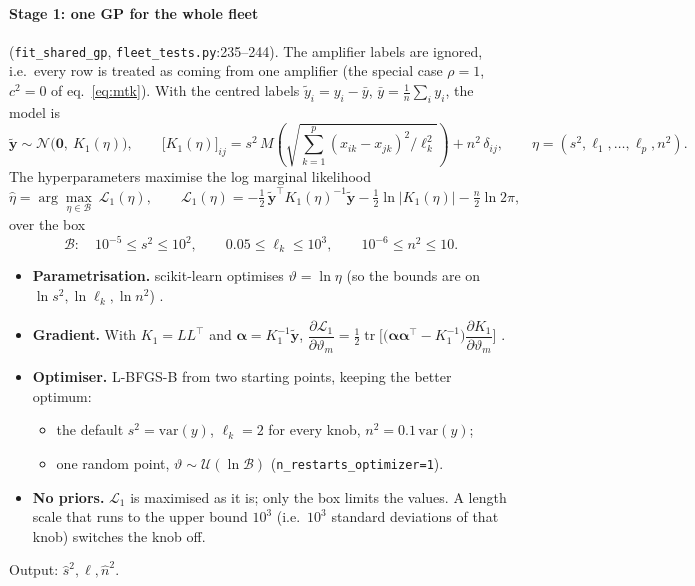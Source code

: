\documentclass[10pt,a4paper]{article}
\newcommand{\code}[1]{\texttt{\small #1}}
\begin{document}
\paragraph{Stage 1: one GP for the whole fleet} (\code{fit\_shared\_gp}, \code{fleet\_tests.py}:235--244).
The amplifier labels are ignored, i.e.\ every row is treated as coming from one amplifier (the special case $\rho=1$, $c^2=0$ of
eq.~\eqref{eq:mtk}). With the centred labels $\tilde y_i=y_i-\bar y$, $\bar y=\frac1n\sum_iy_i$, the model is
\begin{equation}
\tilde{\mathbf y}\sim\mathcal N\big(\mathbf 0,\ K_1(\eta)\big),\qquad
\big[K_1(\eta)\big]_{ij}=s^2\,M\!\left(\sqrt{\textstyle\sum_{k=1}^{p}(x_{ik}-x_{jk})^2/\ell_k^2}\right)+n^2\,\delta_{ij},
\qquad \eta=(s^2,\ell_1,\dots,\ell_p,n^2).
\end{equation}
The hyperparameters maximise the log marginal likelihood
\begin{equation}
\hat\eta=\arg\max_{\eta\in\mathcal B}\ \mathcal L_1(\eta),\qquad
\mathcal L_1(\eta)=-\tfrac12\,\tilde{\mathbf y}^\top K_1(\eta)^{-1}\tilde{\mathbf y}-\tfrac12\ln\big|K_1(\eta)\big|-\tfrac n2\ln2\pi ,
\label{eq:stage1}
\end{equation}
over the box
\begin{equation}
\mathcal B:\quad 10^{-5}\le s^2\le10^{2},\qquad 0.05\le\ell_k\le10^{3},\qquad 10^{-6}\le n^2\le10 .
\end{equation}
\begin{itemize}
\item \textbf{Parametrisation.} scikit-learn optimises $\vartheta=\ln\eta$ (so the bounds are on $\ln s^2,\ln\ell_k,\ln n^2$)
  \cite{pedregosa2011}.
\item \textbf{Gradient.} With $K_1=LL^\top$ and $\boldsymbol\alpha=K_1^{-1}\tilde{\mathbf y}$,
  $\dfrac{\partial\mathcal L_1}{\partial\vartheta_m}=\tfrac12\operatorname{tr}\!\Big[\big(\boldsymbol\alpha\boldsymbol\alpha^\top-K_1^{-1}\big)\dfrac{\partial K_1}{\partial\vartheta_m}\Big]$
  \cite[eq.~5.9]{rasmussen2006}.
\item \textbf{Optimiser.} L-BFGS-B \cite{byrd1995} from two starting points, keeping the better optimum:
  \begin{itemize}
  \item the default $s^2=\mathrm{var}(y)$, $\ell_k=2$ for every knob, $n^2=0.1\,\mathrm{var}(y)$;
  \item one random point, $\vartheta\sim\mathcal U(\ln\mathcal B)$ (\code{n\_restarts\_optimizer=1}).
  \end{itemize}
\item \textbf{No priors.} $\mathcal L_1$ is maximised as it is; only the box limits the values. A length scale that runs to the upper
  bound $10^3$ (i.e.\ $10^3$ standard deviations of that knob) switches the knob off.
\end{itemize}
Output: $\hat s^2,\hat\ell,\hat n^2$.
\end{document}
